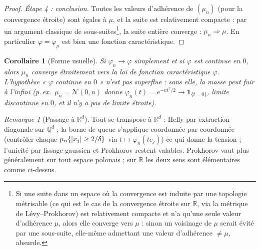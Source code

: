 \documentclass[11pt]{article}
\newcommand{\R}{\mathbb{R}}
\newcommand{\Q}{\mathbb{Q}}
\newcommand{\weak}{\Rightarrow}
\DeclarePairedDelimiter{\abs}{\lvert}{\rvert}
\theoremstyle{plain}
\newtheorem{corollaire}[theoreme]{Corollaire}
\theoremstyle{definition}
\theoremstyle{remark}
\newtheorem{remarque}[theoreme]{Remarque}
\begin{document}
\begin{proof}
\smallskip
\emph{Étape 4 : conclusion.} Toutes les valeurs d'adhérence de $(\mu_n)$ (pour la convergence étroite)
sont égales à $\mu$, et la suite est relativement compacte : par un argument classique de
sous-suites\footnote{Si une suite dans un espace où la convergence est induite par une topologie
métrisable (ce qui est le cas de la convergence étroite sur $\R$, via la métrique de Lévy--Prokhorov)
est relativement compacte et n'a qu'une seule valeur d'adhérence $\mu$, alors elle converge vers
$\mu$ : sinon un voisinage de $\mu$ serait évité par une sous-suite, elle-même admettant une valeur
d'adhérence $\neq\mu$, absurde.}, la suite entière converge : $\mu_n\weak\mu$. En particulier
$\varphi=\varphi_\mu$ est bien une fonction caractéristique.
\end{proof}

\begin{corollaire}[Forme usuelle]
Si $\varphi_n\to\varphi$ simplement et si $\varphi$ est continue en $0$, alors $\mu_n$ converge
étroitement vers la loi de fonction caractéristique $\varphi$. L'hypothèse « $\varphi$ continue en
$0$ » n'est pas superflue : sans elle, la masse peut fuir à l'infini
(p.\,ex.\ $\mu_n=\mathcal N(0,n)$ donne $\varphi_n(t)=e^{-nt^2/2}\to\mathbf 1_{\{t=0\}}$, limite
discontinue en $0$, et il n'y a pas de limite étroite).
\end{corollaire}

\begin{remarque}[Passage à $\R^d$]
Tout se transpose à $\R^d$ : Helly par extraction diagonale sur $\Q^d$ ; la borne de queue
s'applique coordonnée par coordonnée (contrôler chaque $\mu_n\{\abs{x_j}\ge2/\delta\}$ via
$t\mapsto\varphi_n(t e_j)$) ce qui donne la tension ; l'unicité par lissage gaussien et Prokhorov
restent valables. Prokhorov vaut plus généralement sur tout espace polonais ; sur $\R$ les deux sens
sont élémentaires comme ci-dessus.
\end{remarque}
\end{document}
